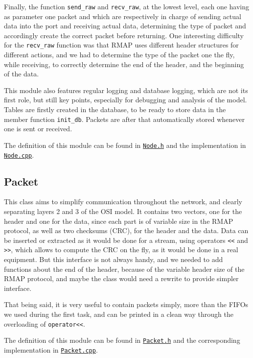 \documentclass[12pt,a4paper]{article}
\begin{document}
Finally, the function \texttt{send\_raw} and \texttt{recv\_raw}, at the lowest level, each one having as parameter one packet and which are respectively in charge of sending actual data into the port and receiving actual data, determining the type of packet and accordingly create the correct packet before returning. One interesting difficulty for the \texttt{recv\_raw} function was that RMAP uses different header structures for different actions, and we had to determine the type of the packet one the fly, while receiving, to correctly determine the end of the header, and the beginning of the data.\medbreak

This module also features regular logging and database logging, which are not its first role, but still key points, especially for debugging and analysis of the model. Tables are firstly created in the database, to be ready to store data in the member function \texttt{init\_db}. Packets are after that automatically stored whenever one is sent or received.

The definition of this module can be found in \href{https://github.com/suai-ipsa2018/ExoMars2020/blob/master/ExoMars2020/Network/Node.h}{\texttt{Node.h}} and the implementation in \href{https://github.com/suai-ipsa2018/ExoMars2020/blob/master/ExoMars2020/Network/Node.cpp}{\texttt{Node.cpp}}.

\subsection{Packet}
This class aims to simplify communication throughout the network, and clearly separating layers 2 and 3 of the OSI model. It contains two vectors, one for the header and one for the data, since each part is of variable size in the RMAP protocol, as well as two checksums (CRC), for the header and the data. Data can be inserted or extracted as it would be done for a stream, using operators \verb|<<| and \verb|>>|, which allows to compute the CRC on the fly, as it would be done in a real equipment. But this interface is not always handy, and we needed to add functions about the end of the header, because of the variable header size of the RMAP protocol, and maybe the class would need a rewrite to provide simpler interface.

That being said, it is very useful to contain packets simply, more than the FIFOs we used during the first task, and can be printed in a clean way through the overloading of  \verb|operator<<|.

The definition of this module can be found in \href{https://github.com/suai-ipsa2018/ExoMars2020/blob/master/ExoMars2020/Network/Packet.h}{\texttt{Packet.h}} and the corresponding implementation in \href{https://github.com/suai-ipsa2018/ExoMars2020/blob/master/ExoMars2020/Network/Packet.cpp}{\texttt{Packet.cpp}}.
\end{document}
